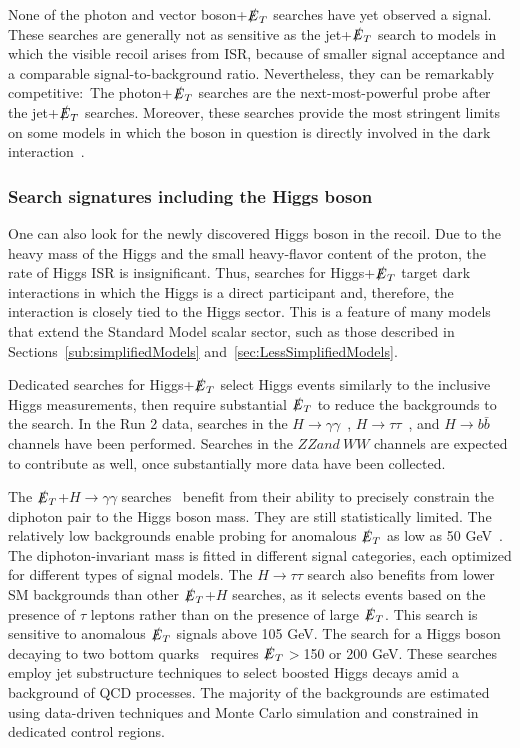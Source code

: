 \documentclass{ar-1col}
\newcommand{\MET}{\ensuremath{\slashed{E}_T}\xspace}
\begin{document}
{None of the photon and vector boson+\MET searches have yet observed a signal. These searches are generally not
as sensitive as the jet+\MET search to models in which the
visible recoil arises from ISR, because of smaller signal
acceptance and a comparable signal-to-background ratio. Nevertheless, they can
be remarkably competitive:\ The
photon+\MET searches are the next-most-powerful probe after the jet+\MET searches. Moreover,
these searches provide the most stringent limits on some models
in which the boson in question is directly involved in the dark
interaction~\cite{Berlin:2014cfa}.

\subsubsection{Search signatures including the Higgs boson}

One can also look for the newly discovered Higgs boson in the
recoil. Due to the heavy mass of the Higgs and the small
heavy-flavor content of the proton, the rate of Higgs ISR is
insignificant. Thus, searches for Higgs+\MET target dark
interactions in which the Higgs is a direct participant and,
therefore, the interaction is closely tied to the Higgs sector.
This is a feature of many models that extend the Standard Model scalar sector, 
such as those described in Sections~\ref{sub:simplifiedModels} and~\ref{sec:LessSimplifiedModels}. 

Dedicated searches for Higgs+\MET  select Higgs events similarly to
the inclusive Higgs measurements, then require substantial \MET to
reduce the backgrounds to the search. In the Run 2 data, searches
in the 
$H \rightarrow \gamma\gamma$~\cite{Sirunyan:2018fpy,Aaboud:2017uak}, 
$H \rightarrow \tau\tau$~\cite{Sirunyan:2018fpy}, 
and
$H \rightarrow b\bar{b}$~\cite{Aaboud:2017yqz,CMS-PAS-EXO-16-050} channels have been
performed. Searches in the $ZZ and~WW$ channels are
expected to contribute as well, once substantially more data have been
collected.

The \MET+$H \rightarrow \gamma\gamma$
searches~\cite{Sirunyan:2018fpy,Aaboud:2017uak} benefit from
their ability to precisely constrain the diphoton pair to the
Higgs boson mass. They are still statistically limited. The
relatively low backgrounds enable probing for anomalous \MET as low
as 50 GeV~\cite{Sirunyan:2018fpy}. The diphoton-invariant mass
is fitted in different signal categories, each optimized for
different types of signal models. 
The $H \rightarrow \tau\tau$ search also benefits from lower SM backgrounds 
than other \MET+$H$ searches, as it selects events based on the presence 
of $\tau$ leptons rather than on the presence of large \MET. This search 
is sensitive to anomalous \MET signals above 105 GeV. 
The search for a Higgs boson decaying to
two bottom quarks~\cite{Aaboud:2017yqz,CMS-PAS-EXO-16-050} requires \MET$>$150 or 200 GeV.
These searches employ jet substructure techniques to
select boosted Higgs decays amid a background of QCD processes.
The majority of the backgrounds are estimated using
data-driven techniques and Monte Carlo simulation and constrained in dedicated control regions. 

}
\end{document}
